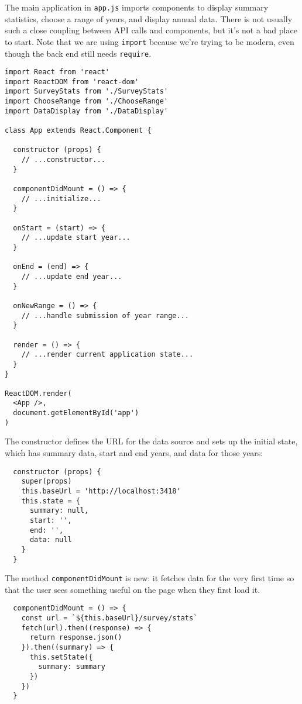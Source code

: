 The main application in \texttt{app.js} imports components to display summary statistics,
choose a range of years,
and display annual data.
There is not usually such a close coupling between API calls and components,
but it's not a bad place to start.
Note that we are using \texttt{import} because we're trying to be modern,
even though the back end still needs \texttt{require}.

\begin{verbatim}
import React from 'react'
import ReactDOM from 'react-dom'
import SurveyStats from './SurveyStats'
import ChooseRange from './ChooseRange'
import DataDisplay from './DataDisplay'

class App extends React.Component {

  constructor (props) {
    // ...constructor...
  }

  componentDidMount = () => {
    // ...initialize...
  }

  onStart = (start) => {
    // ...update start year...
  }

  onEnd = (end) => {
    // ...update end year...
  }

  onNewRange = () => {
    // ...handle submission of year range...
  }

  render = () => {
    // ...render current application state...
  }
}

ReactDOM.render(
  <App />,
  document.getElementById('app')
)
\end{verbatim}

The constructor defines the URL for the data source and sets up the initial state,
which has summary data,
start and end years,
and data for those years:

\begin{verbatim}
  constructor (props) {
    super(props)
    this.baseUrl = 'http://localhost:3418'
    this.state = {
      summary: null,
      start: '',
      end: '',
      data: null
    }
  }
\end{verbatim}

The method \texttt{componentDidMount} is new:
it fetches data for the very first time
so that the user sees something useful on the page when they first load it.

\begin{verbatim}
  componentDidMount = () => {
    const url = `${this.baseUrl}/survey/stats`
    fetch(url).then((response) => {
      return response.json()
    }).then((summary) => {
      this.setState({
        summary: summary
      })
    })
  }
\end{verbatim}

